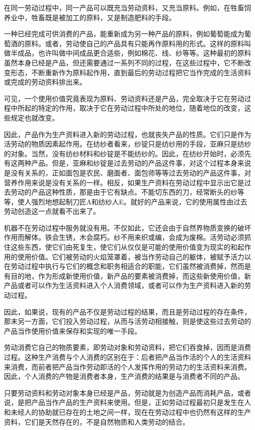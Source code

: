 \documentclass{ctexbook}
\begin{document}
    在同一劳动过程中，同一产品可以既充当劳动资料，又充当原料。例如，在牲畜饲养业中，牲畜既是被加工的原料，又是制造肥料的手段。

    一种已经完成可供消费的产品，能重新成为另一种产品的原料，例如葡萄能成为葡萄酒的原料。或者，劳动使自己的产品具有只能再作原料用的形式。这样的原料叫做半成品，也许叫做中间成品更合适些，例如棉花、线、纱等等。这种最初的原料虽然本身已经是产品，但还需要通过一系列不同的过程，在这些过程中，它不断改变形态，不断重新作为原料起作用，直到最后的劳动过程把它当作完成的生活资料或完成的劳动资料排出来。

    可见，一个使用价值究竟表现为原料、劳动资料还是产品，完全取决于它在劳动过程中所起的特定的作用，取决于它在劳动过程中所处的地位，随着地位的改变，这些规定也就改变。

    因此，产品作为生产资料进入新的劳动过程，也就丧失产品的性质。它们只是作为活劳动的物质因素起作用。在纺纱者看来，纱锭只是纺纱用的手段，亚麻只是纺纱的对象。当然，没有纺纱材料和纱锭是不能纺纱的。因此，在纺纱开始时，必须先有这两种产品。但是，亚麻和纱锭是过去劳动的产品这件事，对这个过程本身来说是没有关系的，正如面包是农民、磨面者、面包师等等过去劳动的产品这件事，对营养作用来说是没有关系的一样。相反，如果生产资料在劳动过程中显示出它是过去劳动的产品这种性质，那是由于它有缺点。不能切东西的刀，经常断头的纱等等，使人强烈地想起制刀匠A和纺纱人E。就好的产品来说，它的使用属性由过去劳动创造这一点就看不出来了。

    机器不在劳动过程中服务就没有用。不仅如此，它还会由于自然界物质变换的破坏作用而解体。铁会生锈，木会腐朽。纱不用来织或编，会成为废棉。活劳动必须抓住这些东西，使它们由死复生，使它们从仅仅是可能的使用价值变为现实的和起作用的使用价值。它们被劳动的火焰笼罩着，被当作劳动自己的躯体，被赋予活力以在劳动过程中执行与它们的概念和职务相适合的职能，它们虽然被消费掉，然而是有目的地，作为形成新使用价值，新产品的要素被消费掉，而这些新使用价值，新产品或者可以作为生活资料进入个人消费领域，或者可以作为生产资料进入新的劳动过程。

    因此，如果说，现有的产品不仅是劳动过程的结果，而且是劳动过程的存在条件，那末另一方面，它们投入劳动过程，从而与活劳动相接触，则是使这些过去劳动的产品当作使用价值来保存和实现的唯一手段。

    劳动消费它自己的物质要素，即劳动对象和劳动资料，把它们吞食掉，因而是消费过程。这种生产消费与个人消费的区别在于：后者把产品当作活的个人的生活资料来消费，而前者把产品当作劳动即活的个人发挥作用的劳动力的生活资料来消费。因此，个人消费的产物是消费者本身，生产消费的结果是与消费者不同的产品。

    只要劳动资料和劳动对象本身已经是产品，劳动就是为创造产品而消耗产品，或者说，是把产品当作产品的生产资料来使用。但是，正如劳动过程最初只是发生在人和未经人的协助就已存在的土地之间一样，现在在劳动过程中也仍然有这样的生产资料，它们是天然存在的，不是自然物质和人类劳动的结合。
\end{document}
